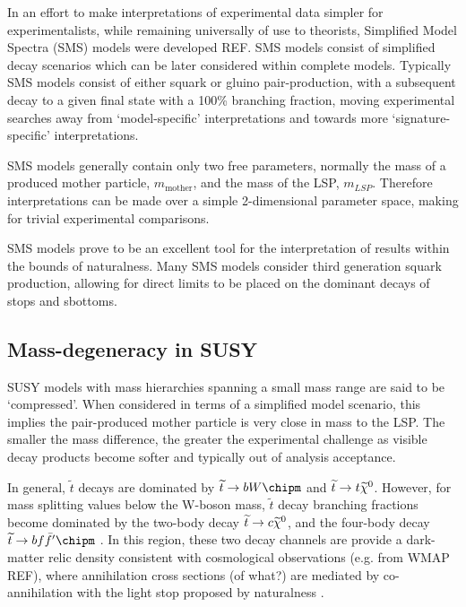 In an effort to make interpretations of experimental data simpler for
experimentalists, while remaining universally of use to theorists,
Simplified Model Spectra (SMS) models were developed REF. SMS models consist of
simplified
decay scenarios which can be later considered within complete models.
Typically SMS models consist of either squark or gluino pair-production, with a
subsequent decay to a given final state with a 100\% branching fraction,
moving
experimental searches away from `model-specific' interpretations and
towards more `signature-specific' interpretations.

SMS models generally contain only two free parameters, normally the mass of a
produced mother particle, $m_{\text{mother}}$, and the mass of the LSP,
$m_{LSP}$. Therefore interpretations can be made over a simple 2-dimensional
parameter space, making for trivial experimental comparisons.


SMS models prove to be an excellent tool for the interpretation of results
within the bounds of naturalness. Many SMS models consider third generation
squark production, allowing for direct limits to be placed on the dominant
decays of stops and sbottoms.

\subsection{Mass-degeneracy in SUSY}
SUSY models with mass hierarchies spanning a small mass range are said to be
`compressed'. When considered in terms of a simplified model scenario, this
implies the pair-produced mother particle is very close in mass to the LSP. The
smaller the mass difference, the greater the experimental challenge as visible
decay products become softer and typically out of analysis acceptance.

In general, $\tilde{t}$ decays are dominated by $\sTop\ra bW\chipm$ and
$\widetilde{t}\rightarrow t\widetilde{\chi}^{0}$. However, for mass splitting values below the W-boson
mass, $\tilde{t}$ decay branching fractions become dominated by
the two-body decay $\widetilde{t}\rightarrow c\widetilde{\chi}^{0}$, and the four-body decay
$\sTop\ra bf\bar{f}'\chipm$ \cite{Boehm:1999tr}. In this region, these two decay
channels are provide a dark-matter relic density consistent with cosmological
observations (e.g. from WMAP REF), where annihilation cross sections (of what?)
are mediated by co-annihilation with the light stop proposed by naturalness
\cite{Balazs:2004bu}.


